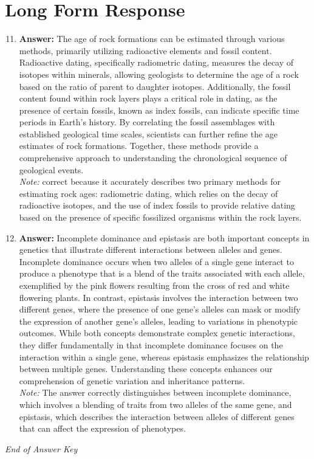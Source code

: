\documentclass[12pt]{article}
\begin{document}
\section*{Long Form Response}
\begin{enumerate}[label=\arabic*.]
\setcounter{enumi}{10}
\item \textbf{Answer:} The age of rock formations can be estimated through various methods, primarily utilizing radioactive elements and fossil content. Radioactive dating, specifically radiometric dating, measures the decay of isotopes within minerals, allowing geologists to determine the age of a rock based on the ratio of parent to daughter isotopes. Additionally, the fossil content found within rock layers plays a critical role in dating, as the presence of certain fossils, known as index fossils, can indicate specific time periods in Earth's history. By correlating the fossil assemblages with established geological time scales, scientists can further refine the age estimates of rock formations. Together, these methods provide a comprehensive approach to understanding the chronological sequence of geological events.
\\ \textit{Note:} correct because it accurately describes two primary methods for estimating rock ages: radiometric dating, which relies on the decay of radioactive isotopes, and the use of index fossils to provide relative dating based on the presence of specific fossilized organisms within the rock layers.
\item \textbf{Answer:} Incomplete dominance and epistasis are both important concepts in genetics that illustrate different interactions between alleles and genes. Incomplete dominance occurs when two alleles of a single gene interact to produce a phenotype that is a blend of the traits associated with each allele, exemplified by the pink flowers resulting from the cross of red and white flowering plants. In contrast, epistasis involves the interaction between two different genes, where the presence of one gene's alleles can mask or modify the expression of another gene's alleles, leading to variations in phenotypic outcomes. While both concepts demonstrate complex genetic interactions, they differ fundamentally in that incomplete dominance focuses on the interaction within a single gene, whereas epistasis emphasizes the relationship between multiple genes. Understanding these concepts enhances our comprehension of genetic variation and inheritance patterns.
\\ \textit{Note:} The answer correctly distinguishes between incomplete dominance, which involves a blending of traits from two alleles of the same gene, and epistasis, which describes the interaction between alleles of different genes that can affect the expression of phenotypes.
\end{enumerate}

\vfill
\noindent\textit{End of Answer Key}
\end{document}

